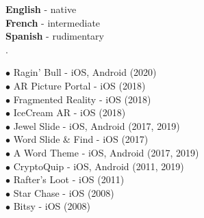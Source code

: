 \documentclass[9pt]{developercv}
\begin{document}
\begin{minipage}[t]{0.5\textwidth}
\textbf{English} - native\\
\textbf{French} - intermediate\\
\textbf{Spanish} - rudimentary\\
.
\end{minipage}
\hfill
\begin{minipage}[t]{0.5\textwidth}
$\bullet$ Ragin' Bull - iOS, Android (2020)\\
$\bullet$ AR Picture Portal - iOS (2018)\\
$\bullet$ Fragmented Reality - iOS (2018)\\
$\bullet$ IceCream AR - iOS (2018)\\
$\bullet$ Jewel Slide - iOS, Android (2017, 2019)\\
$\bullet$ Word Slide \& Find - iOS (2017)\\
$\bullet$ A Word Theme - iOS, Android (2017, 2019)\\
$\bullet$ CryptoQuip - iOS, Android (2011, 2019)\\
$\bullet$ Rafter's Loot - iOS (2011)\\
$\bullet$ Star Chase - iOS (2008)\\
$\bullet$ Bitsy - iOS (2008)\\
\end{minipage}

\end{document}
